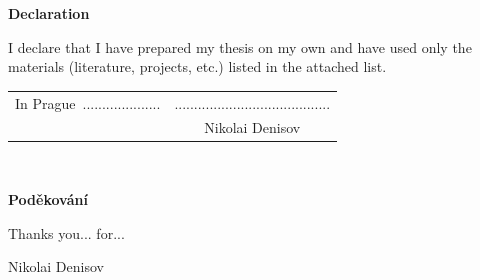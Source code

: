 \documentclass[a4paper,oneside,12pt]{book}
\newcommand{\tb}{\textbf} %
\newcommand{\autor}{Nikolai Denisov}
\newcommand{\kde}{Prague}
\newcommand{\prohlaseni}{I declare that I have prepared my thesis on my own and have used only the materials (literature, projects, etc.) listed in the attached list.}
\newcommand{\podekovani}{Thanks you... for...} %
\begin{document}
    \tb{Declaration} %

    \vspace{1em} %
    \prohlaseni

    \vspace{2em}  %
    \hspace{-0.5em}\begin{tabularx}{\textwidth}{X c}  %
                       In \kde\  .................... &........................................ \\	%
                       & \autor
    \end{tabularx}	%


    \newpage
    \thispagestyle{empty}

    ~
    \vfill %

    \tb{Poděkování}

    \vspace{1em} %
    \podekovani
    \begin{flushright}
        \autor
    \end{flushright}  %


    \newpage   %
    \thispagestyle{empty}   %

    \newbox\odstavecbox
    \newlength\vyskaodstavce
    \newcommand\odstavec[2]{%
        \setbox\odstavecbox=\hbox{%
            \parbox[t]{#1}{#2\vrule width 0pt depth 4pt}}%
        \global\vyskaodstavce=\dp\odstavecbox
        \box\odstavecbox}
    \newcommand{\delka}{120mm} %
\end{document}
